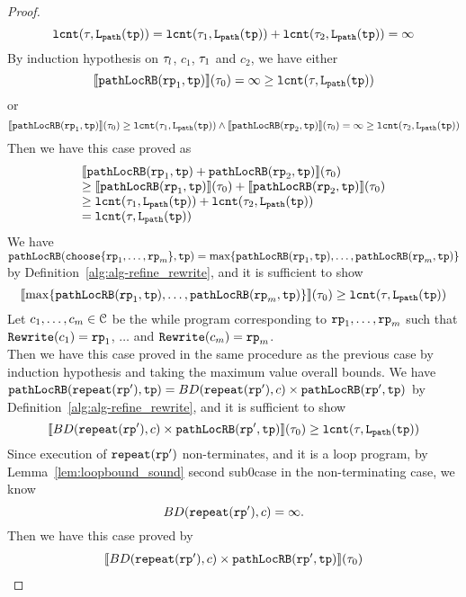 \begin{proof}
\[
  \mathtt{lcnt}(\mathtt{\tau}, \mathtt{L}_{\mathtt{path}}(\mathtt{tp}))  = \mathtt{lcnt}(\mathtt{\tau}_1,  \mathtt{L}_{\mathtt{path}}(\mathtt{tp}))  + \mathtt{lcnt}(\mathtt{\tau}_2,  \mathtt{L}_{\mathtt{path}}(\mathtt{tp})) = \infty
\]
By induction hypothesis on $\mathtt{\tau}_l$, $c_1$, $\mathtt{\tau}_1$ and $c_2$, we have
either 
\[
  \llbracket \mathtt{pathLocRB}(\mathtt{rp}_1, \mathtt{tp}) \rrbracket(\mathtt{\tau}_0) = \infty \geq \mathtt{lcnt}(\mathtt{\tau},  \mathtt{L}_{\mathtt{path}}(\mathtt{tp})) 
\]
or
\[
  \llbracket \mathtt{pathLocRB}(\mathtt{rp}_1, \mathtt{tp}) \rrbracket(\mathtt{\tau}_0) \geq \mathtt{lcnt}(\mathtt{\tau}_1,  \mathtt{L}_{\mathtt{path}}(\mathtt{tp})) 
  \land 
  \llbracket \mathtt{pathLocRB}(\mathtt{rp}_2, \mathtt{tp}) \rrbracket(\mathtt{\tau}_0)  = \infty \geq \mathtt{lcnt}(\mathtt{\tau}_2,  \mathtt{L}_{\mathtt{path}}(\mathtt{tp}))  
\]
Then we have this case proved as
\[
  \begin{array}{l}
  \llbracket \mathtt{pathLocRB}(\mathtt{rp}_1, \mathtt{tp}) + \mathtt{pathLocRB}(\mathtt{rp}_2, \mathtt{tp}) \rrbracket(\mathtt{\tau}_0)
  \\
  \geq \llbracket \mathtt{pathLocRB}(\mathtt{rp}_1, \mathtt{tp}) \rrbracket(\mathtt{\tau}_0) + \llbracket \mathtt{pathLocRB}(\mathtt{rp}_2, \mathtt{tp}) \rrbracket(\mathtt{\tau}_0)
  \\
  \geq \mathtt{lcnt}(\mathtt{\tau}_1,  \mathtt{L}_{\mathtt{path}}(\mathtt{tp}))  + \mathtt{lcnt}(\mathtt{\tau}_2,  \mathtt{L}_{\mathtt{path}}(\mathtt{tp})) 
  \\
  = \mathtt{lcnt}(\mathtt{\tau}, \mathtt{L}_{\mathtt{path}}(\mathtt{tp}))
  \end{array}
  \] 
We have $\outinB(\rpchoose{\rprog_1, \ldots, \rprog_m }, \tpath) = \max\left\{ \outinB(\rprog_1, \tpath), \ldots, \outinB(\rprog_m, \tpath) \right\}$ by Definition~\ref{alg:alg-refine_rewrite}, and
it is sufficient to show
\[
  \econfig{\max\left\{ \outinB(\rprog_1, \tpath), \ldots, \outinB(\rprog_m, \tpath) \right\}}(\trace_0) \geq \lcounter(\trace, \pathl(\tpath)) 
\]
Let $c_1, \ldots, c_m \in \mathcal{C}$ be the while program corresponding to $\mathtt{rp}_1, \ldots, \mathtt{rp}_m$ such that $\mathtt{Rewrite}(c_1) = \mathtt{rp}_1$, $\ldots$ and  $\mathtt{Rewrite}(c_m) = \mathtt{rp}_m$.
\\
Then we have this case proved in the same procedure as the previous case by induction hypothesis and taking the maximum value overall bounds.
We have $\mathtt{pathLocRB}(\mathtt{repeat}(\mathtt{rp}'), \mathtt{tp}) = BD(\mathtt{repeat}(\mathtt{rp}'), c) \times \mathtt{pathLocRB}(\mathtt{rp}', \mathtt{tp})$
by Definition~\ref{alg:alg-refine_rewrite}, and
it is sufficient to show
\[
  \llbracket  BD(\mathtt{repeat}(\mathtt{rp}'), c) \times \mathtt{pathLocRB}(\mathtt{rp}', \mathtt{tp}) \rrbracket (\mathtt{\tau}_0) \geq \mathtt{lcnt}(\mathtt{\tau}, \mathtt{L}_{\mathtt{path}}(\mathtt{tp})) 
\]
Since execution of $\mathtt{repeat}(\mathtt{rp}')$ non-terminates, and it is a loop program,
by Lemma~\ref{lem:loopbound_sound} second sub0case in the non-terminating case, we know
\[
  BD(\mathtt{repeat}(\mathtt{rp}'), c) = \infty.
\]
Then we have this case proved by
\[
  \begin{array}{l}
  \llbracket BD(\mathtt{repeat}(\mathtt{rp}'), c) \times \mathtt{pathLocRB}(\mathtt{rp}', \mathtt{tp}) \rrbracket(\mathtt{\tau}_0) 

\end{array}\]
\end{proof}
